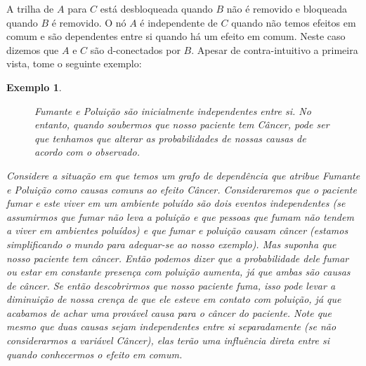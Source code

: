 \documentclass{amsart}
\theoremstyle{plain}
\newcounter{dummy-def}\numberwithin{dummy-def}{subsection}
\newcounter{dummy-thm}\numberwithin{dummy-thm}{subsection}
\newcounter{dummy-prop}\numberwithin{dummy-prop}{subsection}
\newcounter{dummy-ex}\numberwithin{dummy-ex}{subsection}
\newcounter{dummy-eg}\numberwithin{dummy-eg}{subsection}
\newtheorem{example}[dummy-eg]{Exemplo}
\numberwithin{equation}{subsection}
\begin{document}
A trilha de $A$ para $C$ está desbloqueada quando $B$ não é removido e bloqueada quando $B$ é
removido. O nó $A$ é independente de $C$ quando não temos efeitos em comum e são dependentes entre
si quando há um efeito em comum. Neste caso dizemos que $A$ e $C$ são d-conectados por $B$. Apesar
de contra-intuitivo a primeira vista, tome o seguinte exemplo:

\begin{example}
  \begin{figure}[h]
    \caption{\textit{Fumante} e \textit{Poluição} são inicialmente independentes entre si. No
    entanto, quando soubermos que nosso paciente tem \textit{Câncer}, pode ser que tenhamos que
    alterar as probabilidades de nossas causas de acordo com o observado.}
  \end{figure}

  Considere a situação em que temos um grafo de dependência que atribue \textit{Fumante} e
  \textit{Poluição} como causas comuns ao efeito \textit{Câncer}. Consideraremos que o paciente
  fumar e este viver em um ambiente poluído são dois eventos independentes (se assumirmos que fumar
  não leva a poluição e que pessoas que fumam não tendem a viver em ambientes poluídos) e que fumar
  e poluição causam câncer (estamos simplificando o mundo para adequar-se ao nosso exemplo). Mas
  suponha que nosso paciente tem câncer. Então podemos dizer que a probabilidade dele fumar ou
  estar em constante presença com poluição aumenta, já que ambas são causas de câncer. Se então
  descobrirmos que nosso paciente fuma, isso pode levar a diminuição de nossa crença de que ele
  esteve em contato com poluição, já que acabamos de achar uma provável causa para o câncer do
  paciente. Note que mesmo que duas causas sejam independentes entre si separadamente (se não
  considerarmos a variável \textit{Câncer}), elas terão uma influência direta entre si quando
  conhecermos o efeito em comum.
\end{example}
\end{document}
